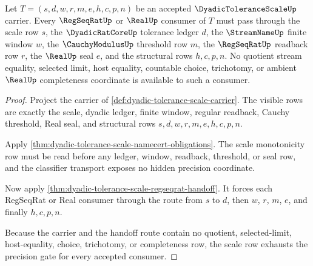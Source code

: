 \begin{theorem}
\label{thm:dyadic-tolerance-scale-precision-gate-exhaustion}
Let $T=(s,d,w,r,m,e,h,c,p,n)$ be an accepted $\DyadicToleranceScaleUp$ carrier. Every $\RegSeqRatUp$ or $\RealUp$ consumer of $T$ must pass through the scale row $s$, the $\DyadicRatCoreUp$ tolerance ledger $d$, the $\StreamNameUp$ finite window $w$, the $\CauchyModulusUp$ threshold row $m$, the $\RegSeqRatUp$ readback row $r$, the $\RealUp$ seal $e$, and the structural rows $h,c,p,n$. No quotient stream equality, selected limit, host equality, countable choice, trichotomy, or ambient $\RealUp$ completeness coordinate is available to such a consumer.
\end{theorem}
\begin{proof}
Project the carrier of \autoref{def:dyadic-tolerance-scale-carrier}. The visible rows are exactly the scale, dyadic ledger, finite window, regular readback, Cauchy threshold, Real seal, and structural rows $s,d,w,r,m,e,h,c,p,n$.

Apply \autoref{thm:dyadic-tolerance-scale-namecert-obligations}. The scale monotonicity row must be read before any ledger, window, readback, threshold, or seal row, and the classifier transport exposes no hidden precision coordinate.

Now apply \autoref{thm:dyadic-tolerance-scale-regseqrat-handoff}. It forces each RegSeqRat or Real consumer through the route from $s$ to $d$, then $w$, $r$, $m$, $e$, and finally $h,c,p,n$.

Because the carrier and the handoff route contain no quotient, selected-limit, host-equality, choice, trichotomy, or completeness row, the scale row exhausts the precision gate for every accepted consumer.
\end{proof}

